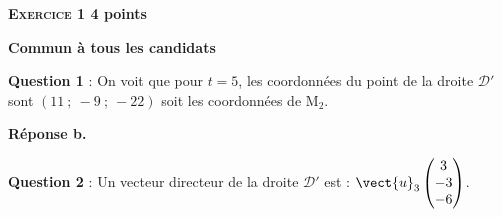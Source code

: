 \textbf{\large\textsc{Exercice 1} \hfill 4 points}

\textbf{Commun à tous les candidats}

\medskip

%
%
%
%
%

\textbf{Question 1} : %
On voit que pour $t = 5$, les coordonnées du point de la droite $\mathcal{D}'$ sont $(11~;~- 9~;~- 22)$ soit les coordonnées de M$_2$.

\smallskip

\hfill\textbf{Réponse b.}

\medskip

\textbf{Question 2} : Un vecteur directeur de la droite $\mathcal{D}'$ est : $\vect{u}_3\begin{pmatrix}3\\- 3\\-6\end{pmatrix}$.

\smallskip

